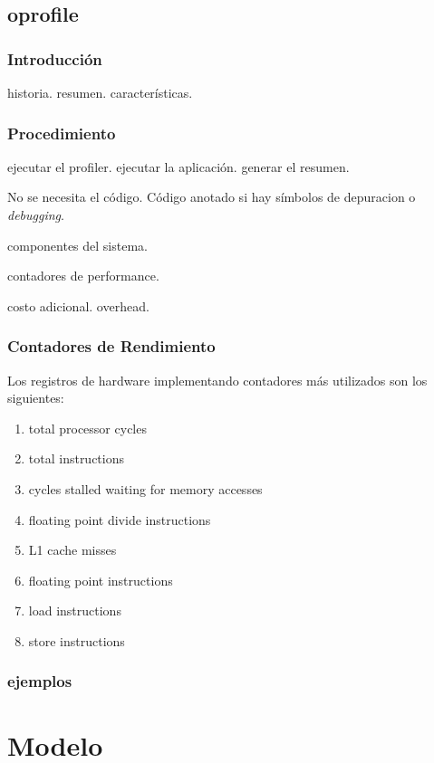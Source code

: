 \documentclass[a4paper]{report}
\begin{document}
\section{oprofile}

\subsection{Introducci\'on}

historia. resumen. caracter\'isticas. 

\subsection{Procedimiento}

ejecutar el profiler. ejecutar la aplicaci\'on. generar el resumen.

No se necesita el c\'odigo. C\'odigo anotado si hay s\'imbolos de depuracion o
{\it debugging}.

componentes del sistema.

contadores de performance.

costo adicional. overhead.

\subsection{Contadores de Rendimiento}

Los registros de hardware implementando contadores m\'as utilizados son los
siguientes:

\begin{enumerate}
\item total processor cycles
\item total instructions
\item cycles stalled waiting for memory accesses
\item floating point divide instructions
\item L1 cache misses
\item floating point instructions
\item load instructions
\item store instructions
\end{enumerate}

\subsection{ejemplos}

\chapter{Modelo}
\end{document}
